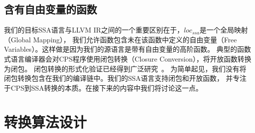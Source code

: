 \subsection{含有自由变量的函数}

我们的目标SSA语言与LLVM IR之间的一个重要区别在于，$loc_{ssa}$是一个全局映射（Global Mapping），
我们允许函数包含未在该函数中定义的自由变量（Free Variables）。这样做是因为我们的源语言是带有自由变量的高阶函数。
典型的函数式语言编译器会对CPS程序使用闭包转换（Closure Conversion），将开放函数转换为闭包。
闭包转换的形式化验证已经得到广泛研究~\cite{paraskevopoulou2019closure,wang-esop2016}。
为简单起见，我们没有将闭包转换包含在我们的编译链中。我们的SSA语言支持闭包和开放函数，
并专注于CPS到SSA转换的本质。在接下来的内容中我们将讨论这一点。

\section{转换算法设计} \label{sec:cpsssatrans}

